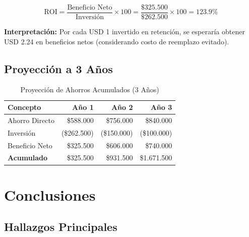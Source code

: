 \documentclass[11pt,a4paper,twoside]{article}
\begin{document}
\[
\text{ROI} = \frac{\text{Beneficio Neto}}{\text{Inversión}} \times 100 = \frac{\$325.500}{\$262.500} \times 100 = 123.9\%
\]

\textbf{Interpretación:} Por cada USD 1 invertido en retención, se esperaría obtener USD 2.24 en beneficios netos (considerando costo de reemplazo evitado).

\subsection{Proyección a 3 Años}

\begin{table}[H]
    \centering
    \caption{Proyección de Ahorros Acumulados (3 Años)}
    \begin{tabular}{|l|r|r|r|}
        \toprule
        \textbf{Concepto} & \textbf{Año 1} & \textbf{Año 2} & \textbf{Año 3} \\
        \midrule
        Ahorro Directo & \$588.000 & \$756.000 & \$840.000 \\
        Inversión & (\$262.500) & (\$150.000) & (\$100.000) \\
        Beneficio Neto & \$325.500 & \$606.000 & \$740.000 \\
        \midrule
        \textbf{Acumulado} & \$325.500 & \$931.500 & \$1.671.500 \\
        \bottomrule
    \end{tabular}
\end{table}

\newpage

\section{Conclusiones}

\subsection{Hallazgos Principales}
\end{document}
